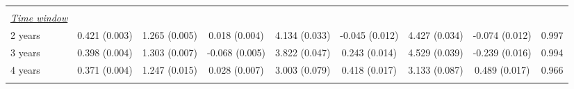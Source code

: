 \begin{tabular}{@{\extracolsep{5pt}} l cccccccc}
 &   &   &   &   &   &   &   &  \\ 
\underline{{\it Time window}} &   &   &   &   &   &   &   &  \\ 
2 years & 0.421 (0.003) & 1.265 (0.005) & 0.018 (0.004) & 4.134 (0.033) & -0.045 (0.012) & 4.427 (0.034) & -0.074 (0.012) & 0.997 \\ 
3 years & 0.398 (0.004) & 1.303 (0.007) & -0.068 (0.005) & 3.822 (0.047) & 0.243 (0.014) & 4.529 (0.039) & -0.239 (0.016) & 0.994 \\ 
4 years & 0.371 (0.004) & 1.247 (0.015) & 0.028 (0.007) & 3.003 (0.079) & 0.418 (0.017) & 3.133 (0.087) & 0.489 (0.017) & 0.966 \\ 
\hline \\[-1.8ex] 
\end{tabular} 
